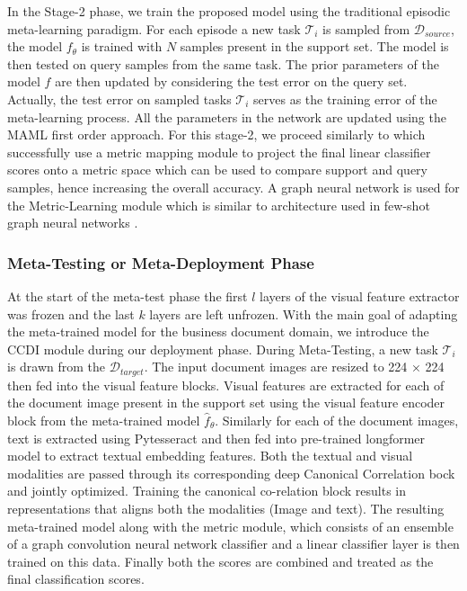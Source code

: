 In the Stage-2 phase, we train the proposed model using the traditional episodic meta-learning paradigm. For each episode a new task $\mathcal{T}_{i}$ is sampled from $\mathcal{D}_{source}$, the model $f_{\theta}$ is trained with $N$ samples present in the support set. The model is then tested on query samples from the same task. The prior parameters of the model $f$ are then updated by considering the test error on the query set. Actually, the test error on sampled tasks $\mathcal{T}_i$ serves as the training error of the meta-learning process. All the parameters in the network are updated using the MAML \citep{finn2017model} first order approach. For this stage-2, we proceed similarly to  \citep{guo2020broader,chen2021self,cai2020cross} which successfully use a metric mapping module to  project the final linear classifier scores onto a metric space which can be used to compare support and query samples, hence increasing the overall accuracy. A graph neural network is used for the Metric-Learning module which is similar to architecture used in few-shot graph neural networks \citep{garcia2018fewshot}.

\subsubsection{Meta-Testing or Meta-Deployment Phase}
At the start of the meta-test phase the first $l$ layers of the visual feature extractor was frozen and the last $k$ layers are left unfrozen. With the main goal of adapting the meta-trained model for the business document domain, we introduce the CCDI module during our deployment phase. During Meta-Testing, a new task $\mathcal{T}_{i}$ is drawn from the $\mathcal{D}_{target}$. The input document images are resized to 224 × 224 then fed into the visual feature blocks. Visual features are extracted for each of the document image present in the support set using the visual feature encoder block from the meta-trained model $\hat{f}_{\theta}$. Similarly for each of the document images, text is extracted using Pytesseract and then fed into pre-trained longformer model \citep{Beltagy2020Longformer} to extract textual embedding features. Both the textual and visual modalities are passed through its corresponding deep Canonical Correlation bock and jointly optimized. Training the canonical co-relation block results in representations that aligns both the modalities (Image and text). The resulting  meta-trained model along with the metric module, which consists of an ensemble of a graph convolution neural network classifier and a linear classifier layer is then trained on this data. Finally both the scores are combined and treated as the final classification scores. 


